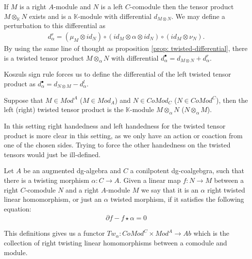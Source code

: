 \documentclass[../thesis.tex]{subfiles}
\begin{document}
            If $M$ is a right $A$-module and $N$ is a left $C$-comodule then the tensor product $M\otimes_\mathbb{K} N$ exists and is a $\mathbb{K}$-module with differential $d_{M\otimes N}$. We may define a perturbation to this differential as 
            \begin{align*}
                d_\alpha^r = (\mu_M\otimes id_N) \circ (id_M \otimes \alpha \otimes id_N) \circ (id_M \otimes \nu_N).
            \end{align*}
            By using the same line of thought as proposition \ref{prop: twisted-differential}, there is a twisted tensor product $M\otimes_\alpha N$ with differential $d_\alpha^\bullet = d_{M\otimes N} + d_\alpha^r$.

            \begin{remark}
                Koszuls sign rule forces us to define the differential of the left twisted tensor product as $d_\alpha^\bullet = d_{N\otimes M} - d_\alpha^l$. 
            \end{remark}
            
            \begin{definition}
                Suppose that $M\in Mod^A$ ($M\in Mod_A$) and $N\in CoMod_C$ ($N\in CoMod^C$), then the left (right) twisted tensor product is the $\mathbb{K}$-module $M\otimes_\alpha N$ ($N\otimes_\alpha M$).
            \end{definition}

            In this setting right handedness and left handedness for the twisted tensor product is more clear in this setting, as we only have an action or coaction from one of the chosen sides. Trying to force the other handedness on the twisted tensors would just be ill-defined.

            \begin{definition}
                Let $A$ be an augmented dg-algebra and $C$ a conilpotent dg-coalgebgra, such that there is a twisting morphism $\alpha: C\rightarrow A$. Given a linear map $f: N \rightarrow M$ between a right $C$-comodule $N$ and a right $A$-module $M$ we say that it is an $\alpha$ right twisted linear homomorphism, or just an  $\alpha$ twisted morphism, if it satisfies the following equation:
                \begin{align*}
                    \partial f - f\star \alpha = 0
                \end{align*} 
            \end{definition}

            This definitions gives us a functor $Tw_\alpha : CoMod^C \times Mod^A \rightarrow Ab$ which is the collection of right twisting linear homomorphisms between a comodule and module.
\end{document}
